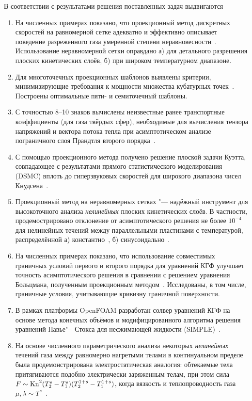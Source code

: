 В соответствии с результатами решения поставленных задач выдвигаются {}
\begin{enumerate}
    \item %
    На численных примерах показано, что проекционный метод дискретных скоростей на равномерной сетке адекватно
    и эффективно описывает поведение разреженного газа умеренной степени неравновесности~\cite{Rogozin2011}.
    Использование неравномерной сетки оправдано а) для детального разрешения плоских кинетических слоёв,
    б) при широком температурном диапазоне.
    \item %
    Для многоточечных проекционных шаблонов выявлены критерии,
    минимизирующие требования к мощности множества кубатурных точек~\cite{Rogozin2016}.
    Построены оптимальные пяти- и семиточечный шаблоны.
    \item %
    С точностью 8--10 знаков вычислены неизвестные ранее транспортные коэффициенты
    (для газа твёрдых сфер), необходимые для вычисления тензора напряжений и вектора потока тепла
    при асимптотическом анализе пограничного слоя Прандтля второго порядка~\cite{Rogozin2016}.
    \item %
    С помощью проекционного метода получено решение плоской задачи Куэтта,
    совпадающее с результатами прямого статистического моделирования (DSMC)
    вплоть до гиперзвуковых скоростей для широкого диапазона чисел Кнудсена~\cite{Rogozin2016}.
    \item %
    Проекционный метод на неравномерных сетках "--- надёжный инструмент для высокоточного анализа
    \emph{нелинейных} плоских кинетических слоёв. В частности, продемострировано отклонение от асимптотического
    решения не более \(10^{-4}\) для нелинейных течений между параллельными пластинами с температурой,
    распределённой а) константно~\cite{Rogozin2016}, б) синусоидально~\cite{Rogozin2017}.
    \item %
    На численных примерах показано, что использование совместимых граничных условий
    первого и второго порядка для уравнений КГФ улучшает точность асимптотического решения
    в сравнении с решением уравнения Больцмана, полученным проекционным методом~\cite{Rogozin2017}.
    Исследованы, в том числе, граничные условия, учитывающие кривизну граничной поверхности.
    \item %
    В рамках платформы OpenFOAM разработан солвер уравнений КГФ
    на основе метода конечных объёмов и модифицированного алгоритма
    решения уравнений Навье"--~Стокса для несжимающей жидкости (SIMPLE)~\cite{Rogozin2014}.
    \item %
    На основе численного параметрического анализа некоторых \emph{нелинейных} течений газа
    между равномерно нагретыми телами в континуальном пределе была продемонстрирована
    электростатическая аналогия: обтекаемые тела притягиваются подобно электрически заряженным телам,
    при этом сила \(F\sim \mathrm{Kn}^2(T_2^s-T_1^s)(T_2^{1+s}-T_1^{1+s})\),
    когда вязкость и теплопроводность газа \(\mu, \lambda \sim T^s\)~\cite{Rogozin2014}.
\end{enumerate}

